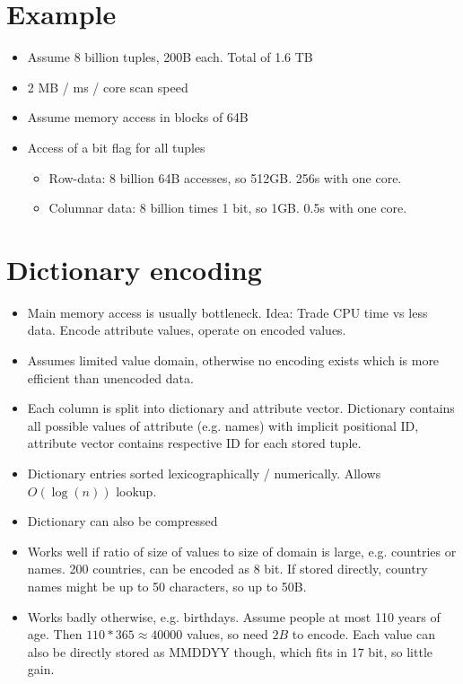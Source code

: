 \documentclass[a4paper]{scrreprt}
\begin{document}
\section{Example}

\begin{itemize}
		\item Assume 8 billion tuples, 200B each. Total of 1.6 TB
		\item 2 MB / ms / core scan speed
		\item Assume memory access in blocks of 64B
		\item Access of a bit flag for all tuples
				\begin{itemize}
						\item Row-data: 8 billion 64B accesses, so 512GB. 256s with one core.
						\item Columnar data: 8 billion times 1 bit, so 1GB. 0.5s with one core.
				\end{itemize}
\end{itemize}

\section{Dictionary encoding}

\begin{itemize}
		\item Main memory access is usually bottleneck. Idea: Trade CPU time vs
				less data. Encode attribute values, operate on encoded values.
		\item Assumes limited value domain, otherwise no encoding exists which
				is more efficient than unencoded data.
		\item Each column is split into dictionary and attribute vector.
				Dictionary contains all possible values of attribute (e.g.
				names) with implicit positional ID, attribute vector contains
				respective ID for each stored tuple.
		\item Dictionary entries sorted lexicographically / numerically. Allows
				$O(\log(n))$ lookup.
		\item Dictionary can also be compressed
		\item Works well if ratio of size of values to size of domain is large,
				e.g. countries or names. 200 countries, can be encoded as 8
				bit. If stored directly, country names might be up to 50
				characters, so up to 50B.
		\item Works badly otherwise, e.g. birthdays. Assume people at most 110
				years of age. Then $110*365 \approx 40000$ values, so need $2B$
				to encode. Each value can also be directly stored as MMDDYY
				though, which fits in 17 bit, so little gain.
\end{itemize}
\end{document}
